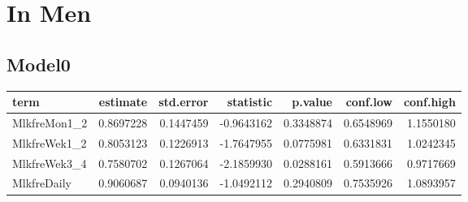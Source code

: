 \documentclass[]{article}
\newenvironment{Shaded}{\begin{snugshade}}{\end{snugshade}}
\newcommand{\CommentTok}[1]{\textcolor[rgb]{0.56,0.35,0.01}{\textit{#1}}}
\newcommand{\DataTypeTok}[1]{\textcolor[rgb]{0.13,0.29,0.53}{#1}}
\newcommand{\KeywordTok}[1]{\textcolor[rgb]{0.13,0.29,0.53}{\textbf{#1}}}
\newcommand{\NormalTok}[1]{#1}
\newcommand{\OperatorTok}[1]{\textcolor[rgb]{0.81,0.36,0.00}{\textbf{#1}}}
\newcommand{\OtherTok}[1]{\textcolor[rgb]{0.56,0.35,0.01}{#1}}
\newcommand{\StringTok}[1]{\textcolor[rgb]{0.31,0.60,0.02}{#1}}
\begin{document}
\begin{Shaded}
\end{Shaded}

\hypertarget{in-men-3}{%
\section{In Men}\label{in-men-3}}

\hypertarget{model0-6}{%
\subsection{Model0}\label{model0-6}}

\begin{Shaded}
\end{Shaded}

\begin{longtable}[]{@{}lrrrrrr@{}}
\toprule
term & estimate & std.error & statistic & p.value & conf.low &
conf.high\tabularnewline
\midrule
\endhead
MlkfreMon1\_2 & 0.8697228 & 0.1447459 & -0.9643162 & 0.3348874 &
0.6548969 & 1.1550180\tabularnewline
MlkfreWek1\_2 & 0.8053123 & 0.1226913 & -1.7647955 & 0.0775981 &
0.6331831 & 1.0242345\tabularnewline
MlkfreWek3\_4 & 0.7580702 & 0.1267064 & -2.1859930 & 0.0288161 &
0.5913666 & 0.9717669\tabularnewline
MlkfreDaily & 0.9060687 & 0.0940136 & -1.0492112 & 0.2940809 & 0.7535926
& 1.0893957\tabularnewline
\bottomrule
\end{longtable}
\end{document}
